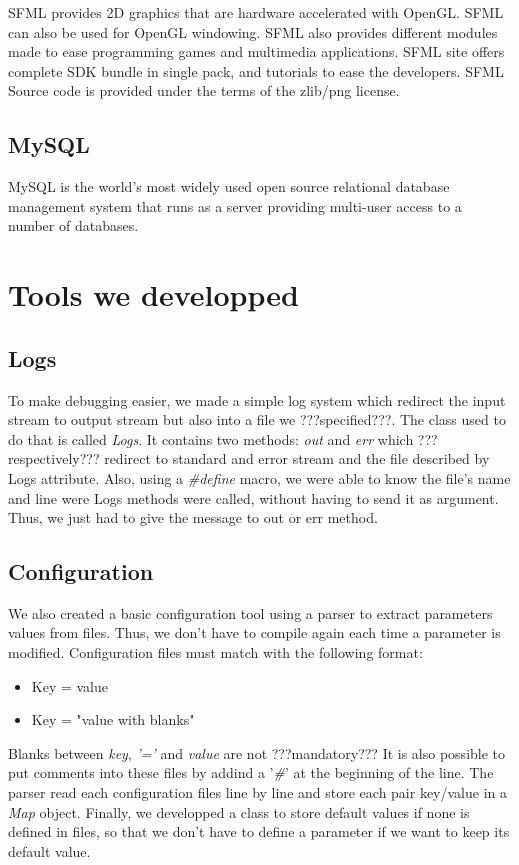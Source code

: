 \documentclass{scrreprt}
\begin{document}
					  SFML provides 2D graphics that are hardware accelerated with OpenGL. SFML can also be used for OpenGL windowing. SFML also provides different modules made to ease programming games and multimedia applications. SFML site offers complete SDK bundle in single pack, and tutorials to ease the developers. SFML Source code is provided under the terms of the zlib/png license.

					  \subsection{MySQL}
					  MySQL is the world's most widely used open source relational database management system that runs as a server providing multi-user access to a number of databases.
					  \section{Tools we developped} 
					  \subsection{Logs}
					  To make debugging easier, we made a simple log system which redirect the input stream to output stream but also into a file we ???specified???. The class used to do that is called \emph{Logs}. It contains two methods: \emph{out} and \emph{err} which ???respectively??? redirect to standard and error stream and the file described by Logs attribute. Also, using a \emph{\#define} macro, we were able to know the file's name and line were Logs methods were called, without having to send it as argument. Thus, we just had to give the message to out or err method.
					  \subsection{Configuration}
					  We also created a basic configuration tool using a parser to extract parameters values from files. Thus, we don't have to compile again each time a parameter is modified. Configuration files must match with the following format:
					  \begin{itemize}
					  \item{Key = value}
					  \item{Key = "value with blanks"}
					  \end{itemize}

					  Blanks between \emph{key}, \emph{'='} and \emph{value} are not ???mandatory???
					  It is also possible to put comments into these files by addind a '\emph{\#}' at the beginning of the line. The parser read each configuration files line by line and store each pair key/value in a \emph{Map} object. Finally, we developped a class to store default values if none is defined in files, so that we don't have to define a parameter if we want to keep its default value.
\end{document}
